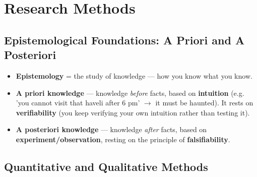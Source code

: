 \chapter{Research Methods}

\section{Epistemological Foundations: A Priori and A Posteriori}

\begin{KeyConcept}
\begin{itemize}
\item \textbf{Epistemology} = the study of knowledge --- how you know what you know.
\item \textbf{A priori knowledge} --- knowledge \emph{before} facts, based on \textbf{intuition} (e.g. 'you cannot visit that haveli after 6 pm' $\rightarrow$ it must be haunted). It rests on \textbf{verifiability} (you keep verifying your own intuition rather than testing it).
\item \textbf{A posteriori knowledge} --- knowledge \emph{after} facts, based on \textbf{experiment/observation}, resting on the principle of \textbf{falsifiability}.
\end{itemize}
\end{KeyConcept}

\section{Quantitative and Qualitative Methods}

